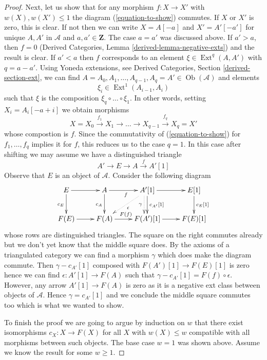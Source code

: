 \documentclass{stacks-project}
\theoremstyle{plain}
\theoremstyle{definition}
\theoremstyle{remark}
\numberwithin{equation}{subsection}
\def\Ext{\mathop{\mathrm{Ext}}\nolimits}
\def\Ob{\mathop{\mathrm{Ob}}\nolimits}
\begin{document}
\begin{proof}
\medskip\noindent
Next, let us show that for any morphism $f : X \to X'$  with
$w(X), w(X') \leq 1$ the diagram (\ref{equation-to-show}) commutes.
If $X$ or $X'$ is zero, this is clear. If not then we can write
$X = A[-a]$ and $X' = A'[-a']$ for unique $A, A'$ in $\mathcal{A}$
and $a, a' \in \mathbf{Z}$. The case $a = a'$ was discussed above.
If $a' > a$, then $f = 0$ (Derived Categories, Lemma
\ref{derived-lemma-negative-exts}) and the result is clear.
If $a' < a$ then $f$ corresponds to an element
$\xi \in \Ext^q(A, A')$ with $q = a - a'$. Using Yoneda extensions, see
Derived Categories, Section \ref{derived-section-ext}, we can find
$A = A_0, A_1, \ldots, A_{q - 1}, A_q = A' \in \Ob(\mathcal{A})$ and
elements
$$
\xi_i \in \Ext^1(A_{i - 1}, A_i)
$$
such that $\xi$ is the composition $\xi_q \circ \ldots \circ \xi_1$.
In other words, setting $X_i = A_i[-a + i]$
we obtain morphisms
$$
X = X_0 \xrightarrow{f_1} X_1 \to \ldots \to X_{q - 1}
\xrightarrow{f_q} X_q = X'
$$
whose compostion is $f$. Since the commutativity of  (\ref{equation-to-show})
for $f_1, \ldots, f_q$ implies it for $f$, this reduces us to the case $q = 1$.
In this case after shifting we may assume we have a distinguished triangle
$$
A' \to E \to A \xrightarrow{f} A'[1]
$$
Observe that $E$ is an object of $\mathcal{A}$. Consider the following
diagram
$$
\xymatrix{
E \ar[d]_{c_E} \ar[r] &
A \ar[d]_{c_A} \ar[r]_f &
A'[1] \ar[d]^{c_{A'}[1]}
\ar@{..>}@<-1ex>[d]_\gamma \ar@{..>}[ld]^\epsilon \ar[r] &
E[1] \ar[d]^{c_E[1]} \\
F(E) \ar[r] &
F(A) \ar[r]^{F(f)} &
F(A')[1] \ar[r] &
F(E)[1]
}
$$
whose rows are distinguished triangles.
The square on the right commutes already but we don't yet know that
the middle square does. By the axioms of a triangulated category
we can find a morphism $\gamma$ which does make the diagram commute.
Then $\gamma - c_{A'}[1]$ composed with
$F(A')[1] \to F(E)[1]$ is zero hence we
can find $\epsilon : A'[1] \to F(A)$ such that
$\gamma - c_{A'}[1] = F(f) \circ \epsilon$. However, any arrow
$A'[1] \to F(A)$ is zero as it is a negative ext class
between objects of $\mathcal{A}$. Hence $\gamma = c_{A'}[1]$
and we conclude the middle square commutes too which is what we
wanted to show.

\medskip\noindent
To finish the proof we are going to argue by induction on $w$
that there exist isomorphisms $c_X : X \to F(X)$ for all
$X$ with $w(X) \leq w$ compatible with all morphisms between
such objects. The base case $w = 1$ was shown above. Assume
we know the result for some $w \geq 1$.


\end{proof}
\end{document}
